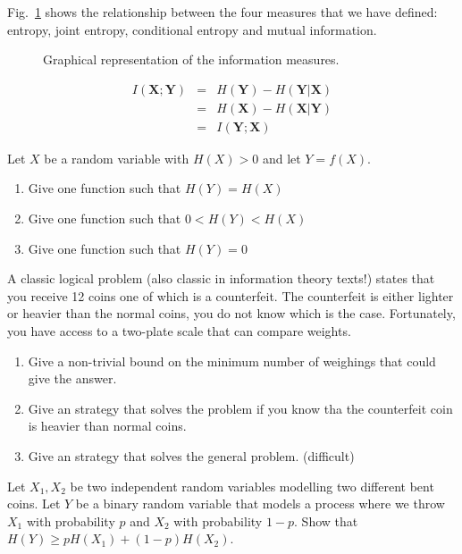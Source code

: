 Fig.~\ref{fig:infmeasures} shows the relationship between the four measures that we have defined: entropy, joint entropy, conditional entropy and mutual information.

\begin{figure}
\begin{center}
\def\svgwidth{.8\columnwidth} 
 
\caption{Graphical representation of the information measures.}
\label{fig:infmeasures}
\end{center}
\end{figure}

\begin{eqnarray}
\label{eq:mutualinformation}
I(\mathbf{X};\mathbf{Y}) &=& H(\mathbf{Y}) - H(\mathbf{Y}|\mathbf{X}) \nonumber\\
         &=& H(\mathbf{X}) - H(\mathbf{X}|\mathbf{Y}) \nonumber\\
         &=& I(\mathbf{Y};\mathbf{X})
\end{eqnarray}
\begin{exercise}
Let $X$ be a random variable with $H(X)>0$ and let $Y=f(X)$. 
\begin{enumerate}
\item Give one function such that $H(Y)=H(X)$
\item Give one function such that $0<H(Y)<H(X)$
\item Give one function such that $H(Y)=0$
\end{enumerate}
\end{exercise}
\begin{exercise}
A classic logical problem (also classic in information theory texts!) states that you receive 12 coins one of which is a counterfeit. The counterfeit is either lighter or heavier than the normal coins, you do not know which is the case. Fortunately, you have access to a two-plate scale that can compare weights.
\begin{enumerate}
\item Give a non-trivial bound on the minimum number of weighings that could give the answer.
\item Give an strategy that solves the problem if you know tha the counterfeit coin is heavier than normal coins.
\item Give an strategy that solves the general problem. (difficult)
\end{enumerate}
\end{exercise}
\begin{exercise}
Let $X_1,X_2$ be two independent random variables modelling two different bent coins. 
Let $Y$ be a binary random variable that models a process where we throw $X_1$ with probability $p$ and $X_2$ with probability $1-p$. 
Show that $H(Y)\geq pH(X_1)+(1-p)H(X_2)$.
\end{exercise}
